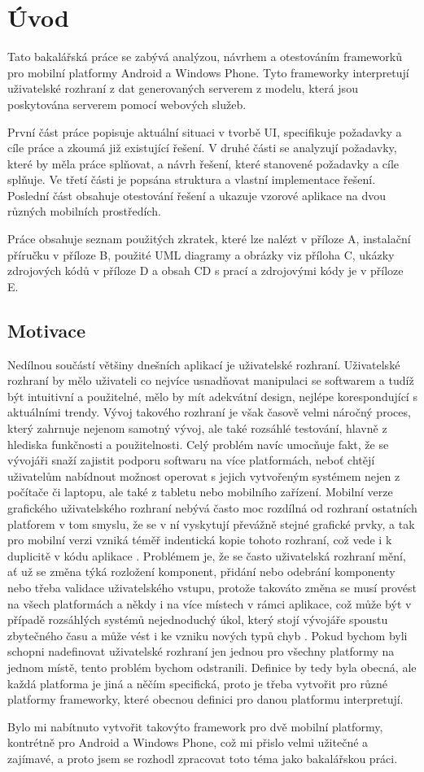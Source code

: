 \chapter{Úvod}
Tato bakalářská práce se zabývá analýzou, návrhem a otestováním frameworků pro mobilní platformy Android a Windows Phone. Tyto frameworky interpretují uživatelské rozhraní z dat generovaných serverem z modelu, která jsou poskytována serverem pomocí webových služeb.

První část práce popisuje aktuální situaci v tvorbě UI, specifikuje požadavky a cíle práce a zkoumá již existující řešení. V druhé části se analyzují požadavky, které by měla práce splňovat, a návrh řešení, které stanovené požadavky a cíle splňuje. Ve třetí části je popsána struktura a vlastní implementace řešení. Poslední část obsahuje otestování řešení a ukazuje vzorové aplikace na dvou různých mobilních prostředích.

Práce obsahuje seznam použitých zkratek, které lze nalézt v příloze A, instalační příručku v příloze B, použité UML diagramy a obrázky viz příloha C, ukázky zdrojových kódů v příloze D a obsah CD s prací a zdrojovými kódy je v příloze E.
 
\section{Motivace}
Nedílnou součástí většiny dnešních aplikací je uživatelské rozhraní. Uživatelské rozhraní by mělo uživateli co nejvíce usnadňovat manipulaci se softwarem a tudíž být intuitivní a použitelné, mělo by mít adekvátní design, nejlépe korespondující s aktuálními trendy. Vývoj takového rozhraní je však časově velmi náročný proces, který zahrnuje nejenom samotný vývoj, ale také rozsáhlé testování, hlavně z hlediska funkčnosti a použitelnosti. Celý problém navíc umocňuje fakt, že se vývojáři snaží zajistit podporu softwaru na více platformách, neboť chtějí uživatelům nabídnout možnost operovat s jejich vytvořeným systémem nejen z počítače či laptopu, ale také z tabletu nebo mobilního zařízení. Mobilní verze grafického uživatelského rozhraní nebývá často moc rozdílná od rozhraní ostatních platforem v tom smyslu, že se v ní vyskytují převážně stejné grafické prvky, a tak pro mobilní verzi vzniká téměř indentická kopie tohoto rozhraní, což vede i k duplicitě v kódu aplikace \cite{on-web-services}. Problémem je, že se často uživatelská rozhraní mění, ať už se změna týká rozložení komponent, přidání nebo odebrání komponenty nebo třeba validace uživatelského vstupu, protože takováto změna se musí provést na všech platformách a někdy i na více místech v rámci aplikace, což může být v případě rozsáhlých systémů nejednoduchý úkol, který stojí vývojáře spoustu zbytečného času a může vést i ke vzniku nových typů chyb \cite{towards-smart-design}. Pokud bychom byli schopni nadefinovat uživatelské rozhraní jen jednou pro všechny platformy na jednom místě, tento problém bychom odstranili. Definice by tedy byla obecná, ale každá platforma je jiná a něčím specifická, proto je třeba vytvořit pro různé platformy frameworky, které obecnou definici pro danou platformu interpretují. 

Bylo mi nabítnuto vytvořit takovýto framework pro dvě mobilní platformy, kontrétně pro Android a Windows Phone, což mi přislo velmi užitečné a zajímavé, a proto jsem se rozhodl zpracovat toto téma jako bakalářskou práci.
